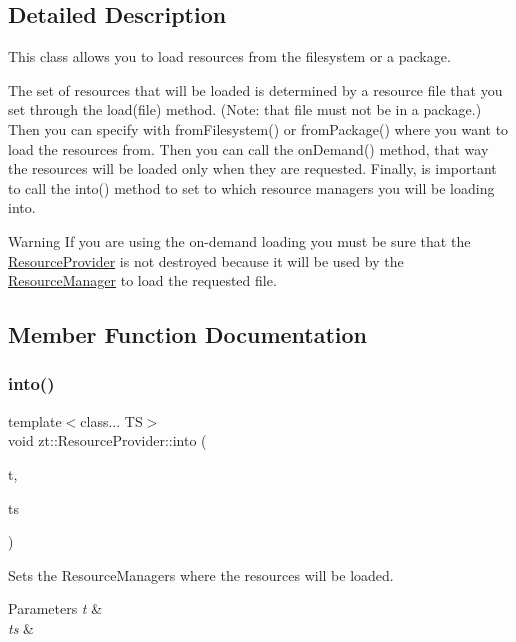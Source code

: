 \subsection{Detailed Description}
This class allows you to load resources from the filesystem or a package. 

The set of resources that will be loaded is determined by a resource file that you set through the load(file) method. (Note\+: that file must not be in a package.) Then you can specify with from\+Filesystem() or from\+Package() where you want to load the resources from. Then you can call the on\+Demand() method, that way the resources will be loaded only when they are requested. Finally, is important to call the into() method to set to which resource managers you will be loading into.

\begin{DoxyWarning}{Warning}
If you are using the on-\/demand loading you must be sure that the \hyperlink{classzt_1_1_resource_provider}{Resource\+Provider} is not destroyed because it will be used by the \hyperlink{classzt_1_1_resource_manager}{Resource\+Manager} to load the requested file. 
\end{DoxyWarning}


\subsection{Member Function Documentation}
\mbox{\label{classzt_1_1_resource_provider_aa23d6aefb7e5f147b37cf08e3c617b5b}} 
\subsubsection{\texorpdfstring{into()}{into()}}
{\footnotesize\ttfamily template$<$class... TS$>$ \\
void zt\+::\+Resource\+Provider\+::into (\begin{DoxyParamCaption}\item[{\hyperlink{classzt_1_1_loading_target}{Loading\+Target} \&}]{t,  }\item[{TS \&...}]{ts }\end{DoxyParamCaption})\hspace{0.3cm}{\ttfamily [inline]}}

Sets the Resource\+Managers where the resources will be loaded. 
\begin{DoxyParams}{Parameters}
{\em t} & \\
\hline
{\em ts} & \\
\hline
\end{DoxyParams}
\mbox{\label{classzt_1_1_resource_provider_a40819044cb7a63200d99f73a66887be1}} 
